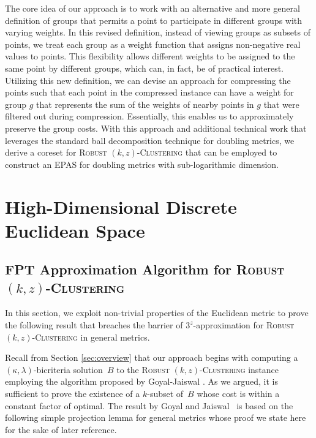 \documentclass[11pt]{article}
\newcommand{\fpt}{\textsf{FPT}\xspace}
\newcommand{\rkc}{\textsc{Robust $(k,z)$-Clustering}\xspace}
\begin{document}
The core idea of our approach is to work with an alternative and more general definition of groups that permits a point to participate in different groups with varying weights. In this revised definition, instead of viewing groups as subsets of points, we treat each group as a weight function that assigns non-negative real values to points. This flexibility allows different weights to be assigned to the same point by different groups, which can, in fact, be of practical interest.
Utilizing this new definition, we can devise an approach for compressing the points such that each point in the compressed instance can have a weight for group $g$ that represents the sum of the weights of nearby points in $g$ that were filtered out during compression. Essentially, this enables us to approximately preserve the group costs. With this approach and additional technical work that leverages the standard ball decomposition technique for doubling metrics, we derive a coreset for \rkc that can be employed to construct an EPAS for doubling metrics with sub-logarithmic dimension.



\section{High-Dimensional Discrete Euclidean Space}
\label{sec:discrete}

\subsection{\fpt Approximation Algorithm for \rkc } \label{sec:FPT-kzc}

In this section, we exploit non-trivial properties of the Euclidean metric to prove the following result that breaches the barrier of $3^z$-approximation for \rkc in general metrics.



\constapproxsfcz*

Recall from Section \ref{sec:overview} that our approach begins with computing a $(\kappa,\lambda)$-bicriteria solution~$B$  to the \rkc instance employing the algorithm proposed by Goyal-Jaiswal \cite{goyal2021tight}. As we argued, it is sufficient to prove the existence of a $k$-subset of~$B$ whose cost is within a constant factor of optimal. The result by Goyal and Jaiswal~\cite{goyal2021tight} is based on the following simple projection lemma for general metrics whose proof we state here for the sake of later reference. 
\end{document}
